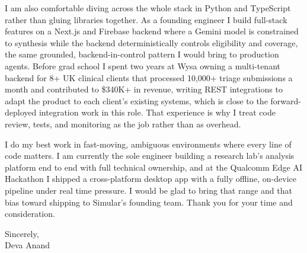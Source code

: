 \documentclass[letterpaper,11pt]{article}
\begin{document}
I am also comfortable diving across the whole stack in Python and TypeScript rather than gluing libraries together. As a founding engineer I build full-stack features on a Next.js and Firebase backend where a Gemini model is constrained to synthesis while the backend deterministically controls eligibility and coverage, the same grounded, backend-in-control pattern I would bring to production agents. Before grad school I spent two years at Wysa owning a multi-tenant backend for 8+ UK clinical clients that processed 10,000+ triage submissions a month and contributed to \$340K+ in revenue, writing REST integrations to adapt the product to each client's existing systems, which is close to the forward-deployed integration work in this role. That experience is why I treat code review, tests, and monitoring as the job rather than as overhead.

I do my best work in fast-moving, ambiguous environments where every line of code matters. I am currently the sole engineer building a research lab's analysis platform end to end with full technical ownership, and at the Qualcomm Edge AI Hackathon I shipped a cross-platform desktop app with a fully offline, on-device pipeline under real time pressure. I would be glad to bring that range and that bias toward shipping to Simular's founding team. Thank you for your time and consideration.

\vspace{4pt}

\noindent Sincerely, \\
Deva Anand
\end{document}
